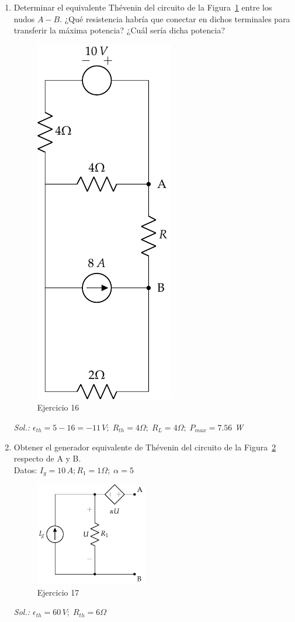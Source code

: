 \begin{enumerate}
\item Determinar el equivalente Thévenin del circuito de la Figura~\ref{fig.ej17_BT1} entre los nudos $A-B$. ¿Qué resistencia habría que conectar en dichos terminales para transferir la máxima potencia? ¿Cuál sería dicha potencia?
\begin{figure}[H]
    \centering
    \includegraphics{../figs/ej17_BT1.pdf}
    \caption{Ejercicio 16}
    \label{fig.ej17_BT1}
\end{figure}

\emph{Sol.: $\epsilon_{th}=5-16=-11\,V;\; R_{th}=4\Omega;\; R_L=4\Omega;\;P_{max}=7.56$ W}


\item Obtener el generador equivalente de Thévenin del circuito de la Figura~\ref{fig.ej18_BT1} respecto de A y B.\\
Datos: $I_g=10\,A; R_1=1\Omega;\; \alpha=5$
\begin{figure}[H]
    \centering
    \includegraphics[height=4.5cm]{../figs/Thevenin1.pdf}
    \caption{Ejercicio 17}
    \label{fig.ej18_BT1}
\end{figure}
\emph{Sol.: $\epsilon_{th}=60\,V;\;R_{th}=6\Omega$}


\end{enumerate}
